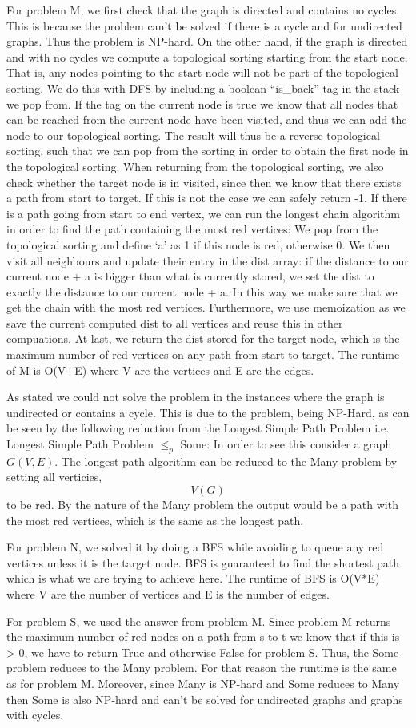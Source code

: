 \documentclass{tufte-handout}
\begin{document}
For problem M, we first check that the graph is directed and contains no cycles. This is because the problem can’t be solved if there is a cycle and for undirected graphs. Thus the problem is NP-hard. On the other hand, if the graph is directed and with no cycles we compute a topological sorting starting from the start node. That is, any nodes pointing to the start node will not
 be part of the topological sorting. We do this with DFS by including a boolean “is\_back” tag in the stack we pop from. If the tag on the current node is true we know that all nodes that can be reached from the current node have been visited, and thus we can add the node to our topological sorting. The result will thus be a reverse topological sorting, 
such that we can pop from the sorting in order to obtain the first node in the topological sorting. When returning from the topological sorting, we also check whether the target node is in visited, since then we know that there exists a path from start to target. If this is not the case we can safely return
 -1. If there is a path going from start to end vertex, we can run the longest chain algorithm in order to find the path containing the most red vertices: We pop from the topological sorting and define ‘a’ as 1 if this node is red, otherwise 0. We then visit all neighbours and update their entry in the dist array: if the distance to our current node + a is bigger
 than what is currently stored, we set the dist to exactly the distance to our current node + a. In this way we make sure that we get the chain with the most red vertices. Furthermore, we use memoization as we save the current computed dist to all vertices and reuse this in other compuations. At last, we return the dist stored for the target node, which is the maximum number of red vertices on any path from start to target. The runtime of M is O(V+E) where V are the vertices and E are the edges.
 
As stated we could not solve the problem in the instances where the graph is undirected or contains a cycle. This is due to the problem, being NP-Hard, as can be seen by the following reduction from the Longest Simple Path Problem i.e. Longest Simple Path Problem $\leq_p$ Some: In order to see this consider a graph $G(V,E)$. The longest path algorithm can be reduced to the Many problem by setting all verticies, $$V(G)$$ to be red. By the nature of the Many problem the output would be a path with the most red vertices, which is the same as the longest path. 

For problem N, we solved it by doing a BFS while avoiding to queue any red vertices unless it is the target node. BFS is guaranteed
to find the shortest path which is what we are trying to achieve here.
The runtime of BFS is O(V*E) where V are the number of vertices and E is the number of edges.

For problem S, we used the answer from problem M. Since problem M returns the maximum number of red nodes on a path from s to t we know that if this is > 0, we have
to return True and otherwise False for problem S. Thus, the Some problem reduces to the Many problem.
For that reason the runtime is the same as for problem M. Moreover, since Many is NP-hard and Some reduces to Many then Some is also NP-hard and can't be solved for
undirected graphs and graphs with cycles.
\end{document}
